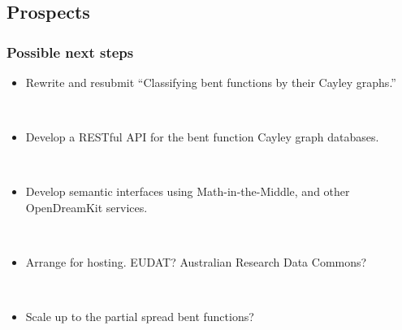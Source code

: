 \documentclass[pdf,sprung,slideColor,nocolorBG]{beamer}
\newenvironment{colortheme}[1]{
\def\ProvidesPackageRCS $##1${\relax}
\renewcommand{\ProcessOptions}{\relax}
\makeatletter

\makeatother
}{}
\begin{document}
\subsection{Prospects}

\begin{colortheme}{jubata}

\begin{frame}[fragile]
\frametitle{Possible next steps}

\begin{itemize}
 \item
Rewrite and resubmit ``Classifying bent functions by their Cayley graphs.''

~

 \item
Develop a RESTful API for the bent function Cayley graph databases.

~

 \item
Develop semantic interfaces using Math-in-the-Middle, and other OpenDreamKit services.

~

 \item
Arrange for hosting. EUDAT? Australian Research Data Commons?

~

 \item
Scale up to the partial spread bent functions?
\end{itemize}

\end{frame}

\end{colortheme}
\end{document}
